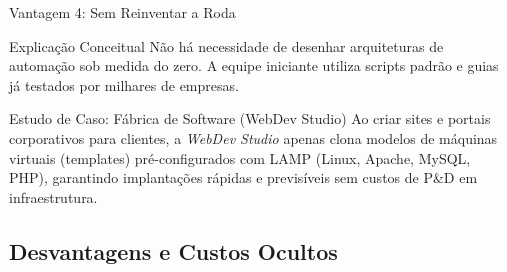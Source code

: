 \documentclass[9pt]{beamer}
\begin{document}
\begin{frame}[fragile]{Vantagem 4: Sem Reinventar a Roda}
\begin{block}{Explicação Conceitual}
Não há necessidade de desenhar arquiteturas de automação sob medida do zero. A equipe iniciante utiliza scripts padrão e guias já testados por milhares de empresas.
\end{block}

\vspace{0.2cm}
\begin{exampleblock}{Estudo de Caso: Fábrica de Software (WebDev Studio)}
Ao criar sites e portais corporativos para clientes, a \textit{WebDev Studio} apenas clona modelos de máquinas virtuais (templates) pré-configurados com LAMP (Linux, Apache, MySQL, PHP), garantindo implantações rápidas e previsíveis sem custos de P\&D em infraestrutura.
\end{exampleblock}

\vspace{0.2cm}
\begin{center}
\end{center}
\end{frame}

\subsection{Desvantagens e Custos Ocultos}
\end{document}
